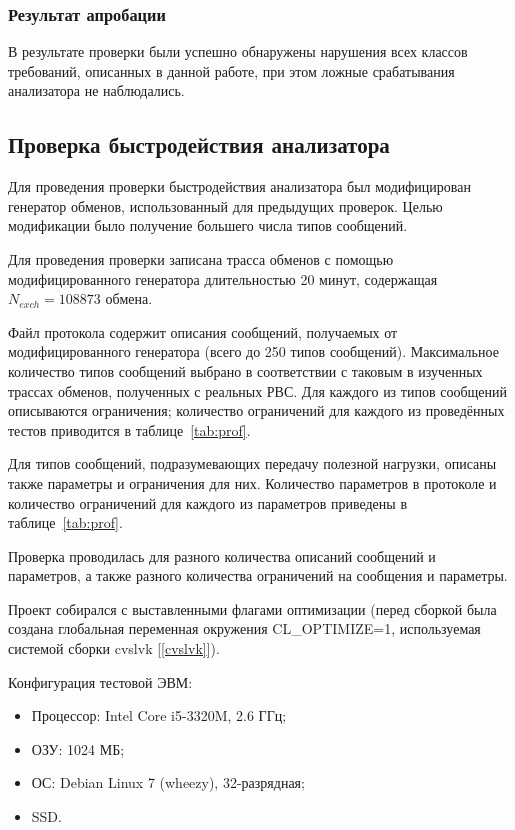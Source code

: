 \subsubsection{Результат апробации}

В результате проверки были успешно обнаружены нарушения всех классов 
требований, описанных в данной работе, при этом ложные срабатывания анализатора 
не наблюдались.

\subsection{Проверка быстродействия анализатора}

Для проведения проверки быстродействия анализатора был модифицирован генератор 
обменов, использованный для предыдущих проверок. Целью модификации 
было получение большего числа типов сообщений.

Для проведения проверки записана трасса обменов с помощью  
модифицированного генератора длительностью 20 минут, содержащая $N_{exch} 
= 108873$ обмена. 

Файл протокола содержит описания сообщений, получаемых от 
модифицированного генератора (всего до 250 типов сообщений). 
Максимальное количество типов сообщений выбрано в соответствии с таковым в 
изученных трассах обменов, полученных с реальных РВС. Для каждого из типов 
сообщений описываются ограничения; количество ограничений для каждого из 
проведённых тестов приводится в таблице~\ref{tab:prof}.

Для типов сообщений, подразумевающих передачу полезной нагрузки, описаны также 
параметры и ограничения для них. Количество параметров в протоколе 
и количество ограничений для каждого из параметров приведены в 
таблице~\ref{tab:prof}.

Проверка проводилась для разного количества описаний сообщений и 
параметров, а также разного количества ограничений на сообщения и параметры.

Проект собирался с выставленными флагами оптимизации (перед сборкой была 
создана глобальная переменная окружения CL\_OPTIMIZE=1, используемая системой 
сборки cvslvk [\ref{cvslvk}]).

Конфигурация тестовой ЭВМ:

\begin{itemize}
 \item Процессор: Intel Core i5-3320M, 2.6 ГГц;
 \item ОЗУ: 1024 МБ;
 \item ОС: Debian Linux 7 (wheezy), 32-разрядная;
 \item SSD. 
\end{itemize}


